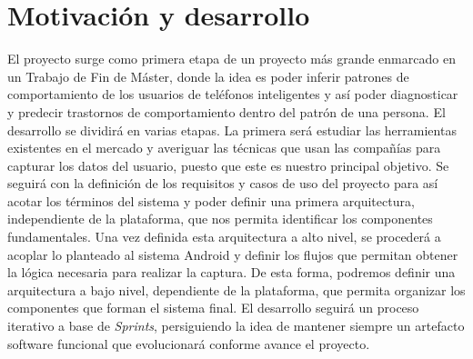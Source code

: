\documentclass[12pt,a4paper,oneside]{book} %
\begin{document}
\section{Motivación y desarrollo}
El proyecto surge como primera etapa de un proyecto más grande enmarcado en un Trabajo de Fin de Máster, donde la idea es poder inferir patrones de comportamiento de los usuarios de teléfonos inteligentes y así poder diagnosticar y predecir trastornos de comportamiento dentro del patrón de una persona. 
\newline
\newline
El desarrollo se dividirá en varias etapas. La primera será estudiar las herramientas existentes en el mercado y averiguar las técnicas que usan las compañías para capturar los datos del usuario, puesto que este es nuestro principal objetivo. 
\newline
\newline
Se seguirá con la definición de los requisitos y casos de uso del proyecto para así acotar los términos del sistema y poder definir una primera arquitectura, independiente de la plataforma, que nos permita identificar los componentes fundamentales. 
\newline
\newline
Una vez definida esta arquitectura a alto nivel, se procederá a acoplar lo planteado al sistema Android y definir los flujos que permitan obtener la lógica necesaria para realizar la captura. De esta forma, podremos definir una arquitectura a bajo nivel, dependiente de la plataforma, que permita organizar los componentes que forman el sistema final. 
\newline
\newline
El desarrollo seguirá un proceso iterativo a base de \textit{Sprints}, persiguiendo la idea de mantener siempre un artefacto software funcional que evolucionará conforme avance el proyecto. 
\end{document}
